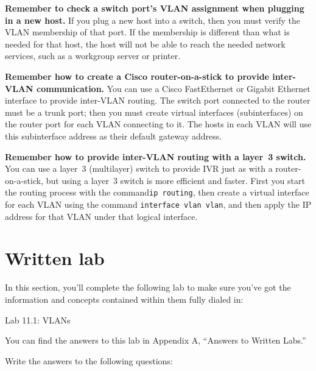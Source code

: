 \documentclass[b5paper,11pt]{memoir}
\begin{document}
\textbf{Remember to check a switch port's VLAN assignment when plugging
in a new host.} If you plug a new host into a switch, then you must
verify the VLAN membership of that port. If the membership is different
than what is needed for that host, the host will not be able to reach
the needed network services, such as a workgroup server or printer.

\textbf{Remember how to create a Cisco router-on-a-stick to provide
inter-VLAN communication.} You can use a Cisco FastEthernet or Gigabit
Ethernet interface to provide inter-VLAN routing. The switch port
connected to the router must be a trunk port; then you must create
virtual interfaces
(subinterfaces) on the router port for each VLAN connecting to it. The
hosts in each VLAN will use this subinterface address as their default
gateway address.

\textbf{Remember how to provide inter-VLAN routing with a layer~3
switch.} You can use a layer~3 (multilayer) switch to provide IVR just
as with a router-on-a-stick, but using a layer~3 switch is more
efficient and faster. First you start the routing process with the
command\texttt{ip\ routing}, then create a virtual interface for each
VLAN using the command \texttt{interface\ vlan\ vlan}, and then apply
the IP address for that VLAN under that logical interface.

\section{Written lab}

In this section, you'll complete the following lab to make sure you've
got the information and concepts contained within them fully dialed in:

Lab 11.1: VLANs

You can find the answers to this lab in Appendix A, ``Answers to Written
Labs.''

Write the answers to the following questions:
\end{document}
